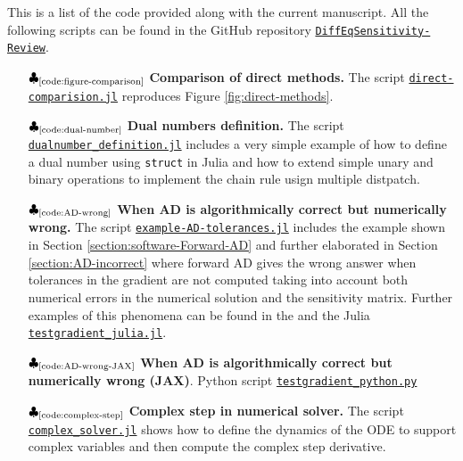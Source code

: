 This is a list of the code provided along with the current manuscript.
All the following scripts can be found in the GitHub repository \href{https://github.com/ODINN-SciML/DiffEqSensitivity-Review}{\texttt{DiffEqSensitivity-Review}}. 
 
\begin{itemize}
    \item[$\clubsuit_\text{\ref{code:figure-comparison}}$] \textbf{Comparison of direct methods.} The script \href{https://github.com/ODINN-SciML/DiffEqSensitivity-Review/blob/main/code/DirectMethods/Comparison/direct-comparision.jl}{\texttt{direct-comparision.jl}} reproduces Figure \ref{fig:direct-methods}.
    
    \item[$\clubsuit_\text{\ref{code:dual-number}}$] \textbf{Dual numbers definition.} The script \href{https://github.com/ODINN-SciML/DiffEqSensitivity-Review/blob/main/code/DirectMethods/DualNumbers/dualnumber_definition.jl}{\texttt{dualnumber\_definition.jl}} includes a very simple example of how to define a dual number using \texttt{struct} in Julia and how to extend simple unary and binary operations to implement the chain rule usign multiple distpatch. 
    
    \item[$\clubsuit_\text{\ref{code:AD-wrong}}$] \textbf{When AD is algorithmically correct but numerically wrong.} The script \href{https://github.com/ODINN-SciML/DiffEqSensitivity-Review/blob/main/code/SensitivityForwardAD/example-AD-tolerances.jl}{\texttt{example-AD-tolerances.jl}} includes the example shown in Section \ref{section:software-Forward-AD} and further elaborated in Section \ref{section:AD-incorrect} where forward AD gives the wrong answer when tolerances in the gradient are not computed taking into account both numerical errors in the numerical solution and the sensitivity matrix. Further examples of this phenomena can be found in the  and the Julia \href{https://github.com/ODINN-SciML/DiffEqSensitivity-Review/blob/main/code/SensitivityForwardAD/testgradient_julia.jl}{\texttt{testgradient\_julia.jl}}.
    
    \item[$\clubsuit_\text{\ref{code:AD-wrong-JAX}}$] \textbf{When AD is algorithmically correct but numerically wrong (JAX)}. Python script \href{https://github.com/ODINN-SciML/DiffEqSensitivity-Review/blob/main/code/SensitivityForwardAD/testgradient_python.py}{\texttt{testgradient\_python.py}}
    
    \item[$\clubsuit_\text{\ref{code:complex-step}}$] \textbf{Complex step in numerical solver.} The script \href{https://github.com/ODINN-SciML/DiffEqSensitivity-Review/blob/main/code/DirectMethods/ComplexStep/complex_solver.jl}{\texttt{complex\_solver.jl}} shows how to define the dynamics of the ODE to support complex variables and then compute the complex step derivative. 
    

\end{itemize}
